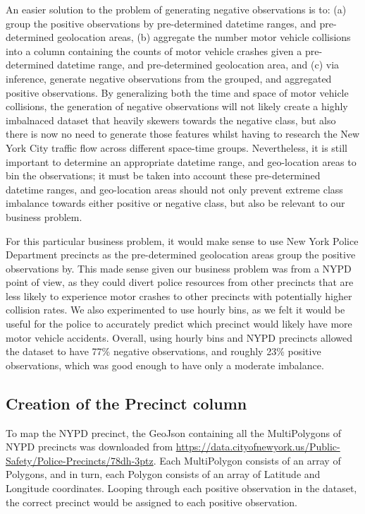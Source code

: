 An easier solution to the problem of generating negative observations is
to: (a) group the positive observations by pre-determined datetime
ranges, and pre-determined geolocation areas, (b) aggregate the number
motor vehicle collisions into a column containing the counts of motor
vehicle crashes given a pre-determined datetime range, and
pre-determined geolocation area, and (c) via inference, generate
negative observations from the grouped, and aggregated positive
observations. By generalizing both the time and space of motor vehicle
collisions, the generation of negative observations will not likely
create a highly imbalnaced dataset that heavily skewers towards the
negative class, but also there is now no need to generate those features
whilst having to research the New York City traffic flow across
different space-time groups. Nevertheless, it is still important to
determine an appropriate datetime range, and geo-location areas to bin
the observations; it must be taken into account these pre-determined
datetime ranges, and geo-location areas should not only prevent extreme
class imbalance towards either positive or negative class, but also be
relevant to our business problem.

For this particular business problem, it would make sense to use New
York Police Department precincts as the pre-determined geolocation areas
group the positive observations by. This made sense given our business
problem was from a NYPD point of view, as they could divert police
resources from other precincts that are less likely to experience motor
crashes to other precincts with potentially higher collision rates. We
also experimented to use hourly bins, as we felt it would be useful for
the police to accurately predict which precinct would likely have more
motor vehicle accidents. Overall, using hourly bins and NYPD precincts
allowed the dataset to have 77\% negative observations, and roughly 23\%
positive observations, which was good enough to have only a moderate
imbalance.

\hypertarget{creation-of-the-precinct-column}{%
\subsection{Creation of the Precinct
column}\label{creation-of-the-precinct-column}}

To map the NYPD precinct, the GeoJson containing all the MultiPolygons
of NYPD precincts was downloaded from
\url{https://data.cityofnewyork.us/Public-Safety/Police-Precincts/78dh-3ptz}.
Each MultiPolygon consists of an array of Polygons, and in turn, each
Polygon consists of an array of Latitude and Longitude coordinates.
Looping through each positive observation in the dataset, the correct
precinct would be assigned to each positive observation.

